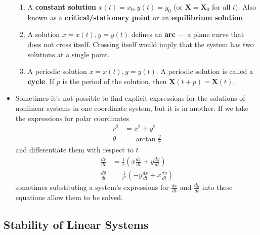 \documentclass{article}
\begin{document}
\begin{itemize}
        \begin{enumerate}
          \item A \textbf{constant solution} $x(t) = x_0, y(t) = y_0$ (or $\mathbf{X} = \mathbf{X}_0$ for all $t$). Also known as a \textbf{critical/stationary point} or an \textbf{equilibrium solution}.

          \item A solution $x = x(t), y = y(t)$ defines an \textbf{arc} — a plane curve that does not cross itself. Crossing itself would imply that the system has two solutions at a single point.

          \item A periodic solution $x = x(t), y = y(t)$. A periodic solution is called a \textbf{cycle}. If $p$ is the period of the solution, then $\mathbf{X}(t + p) = \mathbf{X}(t)$.
        \end{enumerate}

  \item Sometimes it's not possible to find explicit expressions for the solutions of nonlinear systems in one coordinate system, but it is in another. If we take the expressions for polar coordinates \begin{align*}
          r^2    & = x^2 + y^2           \\
          \theta & = \arctan \frac{y}{x}
        \end{align*} and differentiate them with respect to $t$ \begin{align*}
          \frac{d r}{d t}      & = \frac{1}{r} \left( x \frac{d x}{d t} + y \frac{d y}{d t} \right)    \\
          \frac{d \theta}{d t} & = \frac{1}{r^2} \left( -y \frac{d x}{d t} + x \frac{d y}{d t} \right)
        \end{align*} sometimes substituting a system's expressions for $\frac{d x}{d t}$ and $\frac{d y}{d t}$ into these equations allow them to be solved.
\end{itemize}

\subsection{Stability of Linear Systems}
\end{document}
